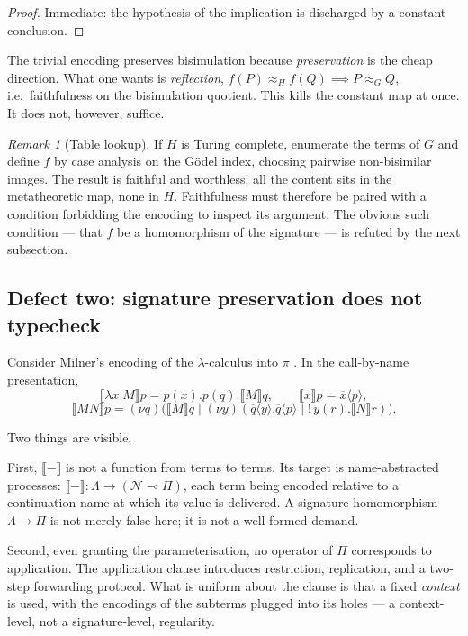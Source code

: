 \documentclass[11pt,a4paper]{article}
\theoremstyle{definition}
\theoremstyle{plain}
\theoremstyle{remark}
\newtheorem{remark}[definition]{Remark}
\newcommand{\enc}[1]{\llbracket #1 \rrbracket}
\newcommand{\bisim}{\approx}
\begin{document}
\begin{proof}
Immediate: the hypothesis of the implication is discharged by a constant conclusion.
\end{proof}

The trivial encoding preserves bisimulation because \emph{preservation} is the cheap
direction. What one wants is \emph{reflection},
$f(P) \bisim_H f(Q) \implies P \bisim_G Q$, i.e.\ faithfulness on the bisimulation
quotient. This kills the constant map at once. It does not, however, suffice.

\begin{remark}[Table lookup]
\label{rem:lookup}
If $H$ is Turing complete, enumerate the terms of $G$ and define $f$ by case
analysis on the G\"odel index, choosing pairwise non-bisimilar images. The result is
faithful and worthless: all the content sits in the metatheoretic map, none in $H$.
Faithfulness must therefore be paired with a condition forbidding the encoding to
inspect its argument. The obvious such condition --- that $f$ be a homomorphism of
the signature --- is refuted by the next subsection.
\end{remark}

\subsection{Defect two: signature preservation does not typecheck}

Consider Milner's encoding of the $\lambda$-calculus into $\pi$ \cite{milner-fap}.
In the call-by-name presentation,
\[
\enc{\lambda x.M}p = p(x).p(q).\enc{M}q,
\qquad
\enc{x}p = \overline{x}\langle p\rangle,
\]
\[
\enc{MN}p = (\nu q)\bigl(\enc{M}q \mid (\nu y)(\overline{q}\langle y\rangle.\overline{q}\langle p\rangle \mid {!}\,y(r).\enc{N}r)\bigr).
\]

Two things are visible.

First, $\enc{-}$ is not a function from terms to terms. Its target is
name-abstracted processes: $\enc{-} : \Lambda \to (\mathcal{N} \multimap \Pi)$,
each term being encoded relative to a continuation name at which its value is
delivered. A signature homomorphism $\Lambda \to \Pi$ is not merely false here; it
is not a well-formed demand.

Second, even granting the parameterisation, no operator of $\Pi$ corresponds to
application. The application clause introduces restriction, replication, and a
two-step forwarding protocol. What is uniform about the clause is that a fixed
\emph{context} is used, with the encodings of the subterms plugged into its holes ---
a context-level, not a signature-level, regularity.
\end{document}
